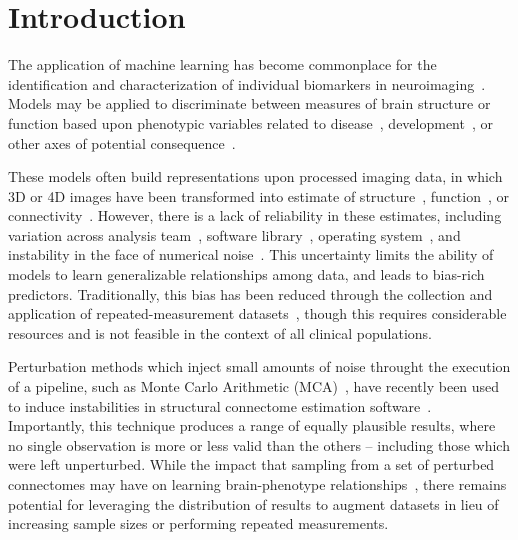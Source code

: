 \documentclass[10pt]{SelfArx} %
\affiliation{\textsuperscript{1}\textit{Montréal Neurological Institute, McGill University, Montréal, QC, Canada}}
\affiliation{\textsuperscript{2}\textit{Department of Computer Science and Software Engineering, Concordia University, Montréal, QC, Canada}}
\begin{document}
\flushbottom %
\maketitle %
\thispagestyle{empty} %

\pagestyle{fancy}
\section*{Introduction}

The application of machine learning has become commonplace for the identification and characterization of individual
biomarkers in neuroimaging~\cite{woo2017building}. Models may be applied to discriminate between measures of brain
structure or function based upon phenotypic variables related to
disease~\cite{Crossley2014-tg,Payabvash2019-tm,Tolan2018-nq}, development~\cite{Zhang2019-ko}, or other axes of
potential consequence~\cite{Zhu2018-cs,Park2015-uj}.

These models often build representations upon processed imaging data, in which 3D or 4D images have been transformed
into estimate of structure~\cite{wade2017machine}, function~\cite{weis2020sex}, or
connectivity~\cite{munsell2015evaluation}. However, there is a lack of reliability in these estimates, including
variation across analysis team~\cite{botvinik2020variability}, software library~\cite{bowring2019exploring}, operating
system~\cite{salari2020file}, and instability in the face of numerical noise~\cite{Kiar2020-kz}. This uncertainty
limits the ability of models to learn generalizable relationships among data, and leads to bias-rich predictors.
Traditionally, this bias has been reduced through the collection and application of repeated-measurement
datasets~\cite{sudlow2015uk,zuo2014open}, though this requires considerable resources and is not feasible in the
context of all clinical populations.

Perturbation methods which inject small amounts of noise throught the execution of a pipeline, such as Monte Carlo
Arithmetic (MCA)~\cite{Parker1997-qq,Denis2016-wo}, have recently been used to induce instabilities in structural
connectome estimation software~\cite{Kiar2020-lb}. Importantly, this technique produces a range of equally plausible
results, where no single observation is more or less valid than the others – including those which were left
unperturbed. While the impact that sampling from a set of perturbed connectomes may have on learning brain-phenotype
relationships~\cite{Kiar2020-kz}, there remains potential for leveraging the distribution of results to augment
datasets in lieu of increasing sample sizes or performing repeated measurements.
\end{document}
